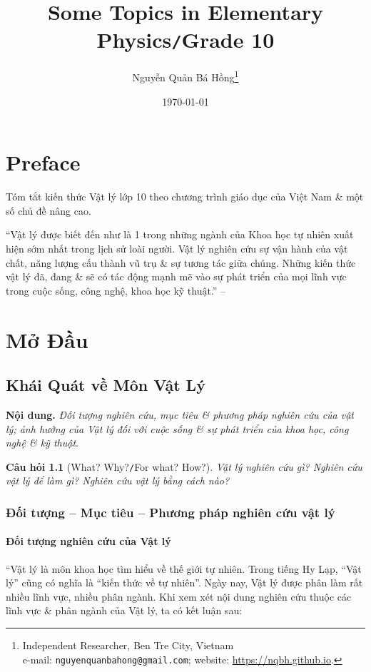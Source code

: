 \documentclass[oneside]{book}
\title{Some Topics in Elementary Physics\texttt{/}Grade 10}
\author{Nguyễn Quản Bá Hồng\footnote{Independent Researcher, Ben Tre City, Vietnam\\e-mail: \texttt{nguyenquanbahong@gmail.com}; website: \url{https://nqbh.github.io}.}}
\date{\today}
\numberwithin{equation}{section}
\newtheorem{cauhoi}{Câu hỏi}[section]
\begin{document}
\frontmatter
\maketitle
\setcounter{secnumdepth}{4}
\setcounter{tocdepth}{3}
\tableofcontents
\newpage


\mainmatter

\chapter*{Preface}

Tóm tắt kiến thức Vật lý lớp 10 theo chương trình giáo dục của Việt Nam \& một số chủ đề nâng cao.

``Vật lý được biết đến như là 1 trong những ngành của Khoa học tự nhiên xuất hiện sớm nhất trong lịch sử loài người. Vật lý nghiên cứu sự vận hành của vật chất, năng lượng cấu thành vũ trụ \& sự tương tác giữa chúng. Những kiến thức vật lý đã, đang \& sẽ có tác động mạnh mẽ vào sự phát triển của mọi lĩnh vực trong cuộc sống, công nghệ, khoa học kỹ thuật.'' -- \cite[p. 3]{SGK_Vat_Ly_10_Chan_Troi_Sang_Tao}


\chapter{Mở Đầu}

\section{Khái Quát về Môn Vật Lý}
\textbf{Nội dung.} \textit{Đối tượng nghiên cứu, mục tiêu \& phương pháp nghiên cứu của vật lý; ảnh hưởng của Vật lý đối với cuộc sống \& sự phát triển của khoa học, công nghệ \& kỹ thuật}.

\begin{cauhoi}[What? Why?\texttt{/}For what? How?]
	Vật lý nghiên cứu gì? Nghiên cứu vật lý để làm gì? Nghiên cứu vật lý bằng cách nào?
\end{cauhoi}

\subsection{Đối tượng -- Mục tiêu -- Phương pháp nghiên cứu vật lý}

\subsubsection{Đối tượng nghiên cứu của Vật lý}
``Vật lý là môn khoa học tìm hiểu về thế giới tự nhiên. Trong tiếng Hy Lạp, ``Vật lý'' cũng có nghĩa là ``kiến thức về tự nhiên''. Ngày nay, Vật lý được phân làm rất nhiều lĩnh vực, nhiều phân ngành. Khi xem xét nội dung nghiên cứu thuộc các lĩnh vực \& phân ngành của Vật lý, ta có kết luận sau:
\end{document}
